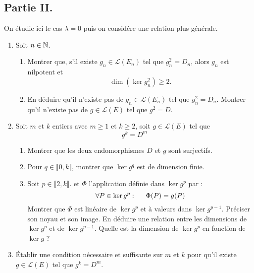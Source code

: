 \subsection*{Partie II.}
On étudie ici le cas $\lambda = 0$ puis on considére une relation plus générale.
\begin{enumerate}
 \item Soit $n\in \mathbb{N}$.
\begin{enumerate}
 \item Montrer que, s'il existe $g_n \in \mathcal{L}(E_n)$ tel que $g_n^2 = D_n$, alors $g_n$ est nilpotent et 
\begin{displaymath}
\dim (\ker g_n^2) \geq 2.  
\end{displaymath}

\item En déduire qu'il n'existe pas de $g_n \in \mathcal{L}(E_n)$ tel que $g_n^2=D_n$. Montrer qu'il n'existe pas de $g \in\mathcal{L}(E)$ tel que $g^2=D$.
\end{enumerate}

\item Soit $m$ et $k$ entiers avec $m\geq 1$ et $k\geq 2$, soit $g \in \mathcal{L}(E)$ tel que 
\begin{displaymath}
 g^k = D^m
\end{displaymath}
\begin{enumerate}
 \item Montrer que les deux endomorphismes $D$ et $g$ sont surjectifs.
\item Pour $q \in \llbracket 0,k \rrbracket$, montrer que $\ker g^q$ est de dimension finie.
\item Soit $p \in \llbracket 2, k\rrbracket$. et $\Phi$ l'application définie dans $\ker g^p$ par :
\begin{displaymath}
 \forall P\in \ker g^p : \hspace{0.5cm} \Phi(P)= g(P)
\end{displaymath}
Montrer que $\Phi$ est linéaire de  $\ker g^p$ et à valeurs dans $\ker g^{p-1}$. Préciser son noyau et son image. En déduire une relation entre les dimensions de $\ker g^p$ et de $\ker g^{p-1}$.\newline
Quelle est la dimension de $\ker g^p$ en fonction de $\ker g$ ?
\end{enumerate}
\item \'Etablir une condition nécessaire et suffisante sur $m$ et $k$ pour qu'il existe $g \in \mathcal{L}(E)$ tel que $g^k=D^m$.
\end{enumerate}

